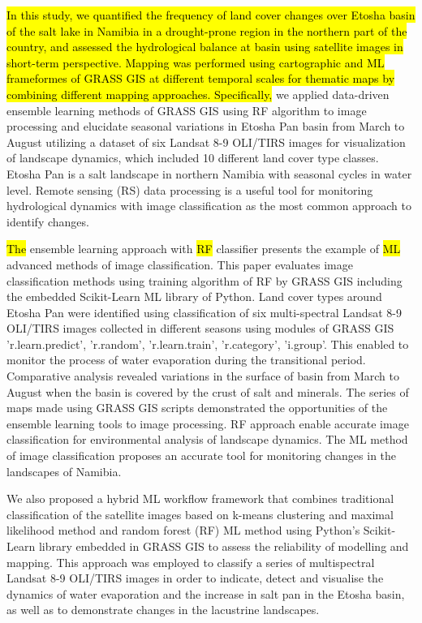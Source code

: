 \documentclass[climate,article,submit,pdftex,moreauthors]{Definitions/mdpi}
\begin{document}
\hl{In this study, we quantified the frequency of land cover changes over Etosha basin of the salt lake in Namibia in a drought-prone region in the northern part of the country, and assessed the hydrological balance at basin using satellite images in short-term perspective. Mapping was performed using cartographic and ML frameformes of GRASS GIS at different temporal scales for thematic maps by combining different mapping approaches. Specifically,} we applied data-driven ensemble learning methods of GRASS GIS using RF algorithm to image processing and elucidate seasonal variations in Etosha Pan basin from March to August utilizing a dataset of six Landsat 8-9 OLI/TIRS images for visualization of landscape dynamics, which included 10 different land cover type classes. Etosha Pan is a salt landscape in northern Namibia with seasonal cycles in water level. Remote sensing (RS) data  processing is a useful tool for monitoring hydrological dynamics with image classification as the most common approach to identify changes. 

\hl{The }ensemble learning approach with \hl{RF} classifier presents the example of \hl{ML} advanced methods of image classification. This paper evaluates image classification methods using training algorithm of RF by GRASS GIS including the embedded Scikit-Learn ML library of Python. Land cover types around Etosha Pan were identified using classification of six multi-spectral Landsat 8-9 OLI/TIRS images collected in different seasons using modules of GRASS GIS 'r.learn.predict', 'r.random', 'r.learn.train', 'r.category', 'i.group'. This enabled to monitor the process of water evaporation during the transitional period. Comparative analysis revealed variations in the surface of basin from March to August when the basin is covered by the crust of salt and minerals. The series of maps made using GRASS GIS scripts demonstrated the opportunities of the ensemble learning tools to image processing. RF approach enable accurate image classification for environmental analysis of landscape dynamics. The ML method of image classification proposes an accurate tool for monitoring changes in the landscapes of Namibia.

We also proposed a hybrid ML workflow framework that combines traditional classification of the satellite images based on k-means clustering and maximal likelihood method and random forest (RF) ML method using Python's Scikit-Learn library embedded in GRASS GIS to assess the reliability of modelling and mapping. This approach was employed to classify a series of multispectral Landsat 8-9 OLI/TIRS images in order to indicate, detect and visualise the dynamics of water evaporation and the increase in salt pan in the Etosha basin, as well as to demonstrate changes in the lacustrine landscapes. 
\end{document}
